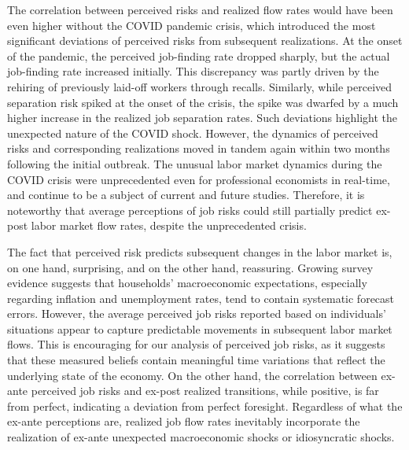 The correlation between perceived risks and realized flow rates would have been even higher without the COVID pandemic crisis, which introduced the most significant deviations of perceived risks from subsequent realizations. At the onset of the pandemic, the perceived job-finding rate dropped sharply, but the actual job-finding rate increased initially. This discrepancy was partly driven by the rehiring of previously laid-off workers through recalls. Similarly, while perceived separation risk spiked at the onset of the crisis, the spike was dwarfed by a much higher increase in the realized job separation rates. Such deviations highlight the unexpected nature of the COVID shock. However, the dynamics of perceived risks and corresponding realizations moved in tandem again within two months following the initial outbreak. The unusual labor market dynamics during the COVID crisis were unprecedented even for professional economists in real-time, and continue to be a subject of current and future studies. Therefore, it is noteworthy that average perceptions of job risks could still partially predict ex-post labor market flow rates, despite the unprecedented crisis.

The fact that perceived risk predicts subsequent changes in the labor market is, on one hand, surprising, and on the other hand, reassuring. Growing survey evidence suggests that households' macroeconomic expectations, especially regarding inflation and unemployment rates, tend to contain systematic forecast errors. However, the average perceived job risks reported based on individuals' situations appear to capture predictable movements in subsequent labor market flows. This is encouraging for our analysis of perceived job risks, as it suggests that these measured beliefs contain meaningful time variations that reflect the underlying state of the economy. On the other hand, the correlation between ex-ante perceived job risks and ex-post realized transitions, while positive, is far from perfect, indicating a deviation from perfect foresight. Regardless of what the ex-ante perceptions are, realized job flow rates inevitably incorporate the realization of ex-ante unexpected macroeconomic shocks or idiosyncratic shocks. 


